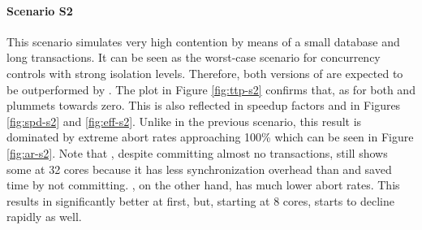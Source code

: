 \paragraph{Scenario S2}


This scenario simulates very high contention by means of a small database and
long transactions. It can be seen as the worst-case scenario for concurrency
controls with strong isolation levels. Therefore, both versions of \midas are
expected to be outperformed by \echo. The plot in Figure \ref{fig:ttp-s2}
confirms that, as \ttp for both \midas and \midasopt plummets towards zero. This
is also reflected in speedup factors and \eff in Figures \ref{fig:spd-s2} and
\ref{fig:eff-s2}. Unlike in the previous scenario, this result is dominated by
extreme abort rates approaching 100\% which can be seen in Figure
\ref{fig:ar-s2}. Note that \midasopt, despite committing almost no transactions,
still shows some \tput at 32 cores because it has less synchronization overhead
than \midas and saved time by not committing. \echo, on the other hand, has much
lower abort rates. This results in significantly better \ttp at first, but, starting at 8 cores, \tput starts to decline rapidly as well.

